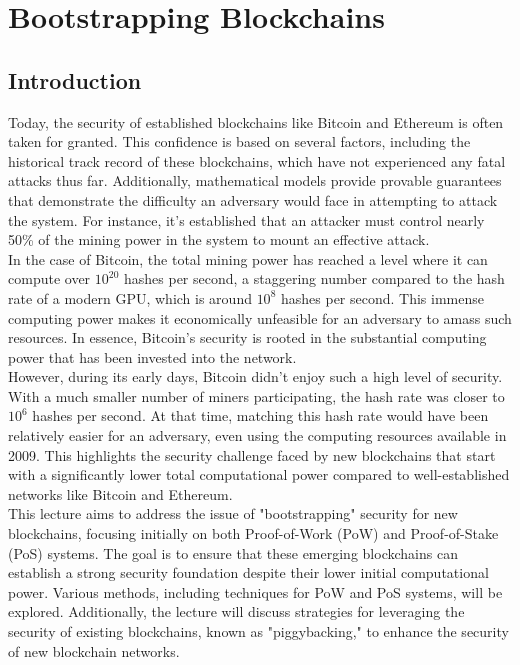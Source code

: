 \chapter{Bootstrapping Blockchains}
\section{Introduction}
Today, the security of established blockchains like Bitcoin and Ethereum is often taken for granted. This confidence is based on several factors, including the historical track record of these blockchains, which have not experienced any fatal attacks thus far. Additionally, mathematical models provide provable guarantees that demonstrate the difficulty an adversary would face in attempting to attack the system. For instance, it's established that an attacker must control nearly 50\% of the mining power in the system to mount an effective attack. \\
In the case of Bitcoin, the total mining power has reached a level where it can compute over $10^{20}$ hashes per second, a staggering number compared to the hash rate of a modern GPU, which is around $10^{8}$ hashes per second. This immense computing power makes it economically unfeasible for an adversary to amass such resources. In essence, Bitcoin's security is rooted in the substantial computing power that has been invested into the network.\\
However, during its early days, Bitcoin didn't enjoy such a high level of security. With a much smaller number of miners participating, the hash rate was closer to $10^{6}$ hashes per second. At that time, matching this hash rate would have been relatively easier for an adversary, even using the computing resources available in 2009. This highlights the security challenge faced by new blockchains that start with a significantly lower total computational power compared to well-established networks like Bitcoin and Ethereum.\\
This lecture aims to address the issue of "bootstrapping" security for new blockchains, focusing initially on both Proof-of-Work (PoW) and Proof-of-Stake (PoS) systems. The goal is to ensure that these emerging blockchains can establish a strong security foundation despite their lower initial computational power. Various methods, including techniques for PoW and PoS systems, will be explored. Additionally, the lecture will discuss strategies for leveraging the security of existing blockchains, known as "piggybacking," to enhance the security of new blockchain networks.
